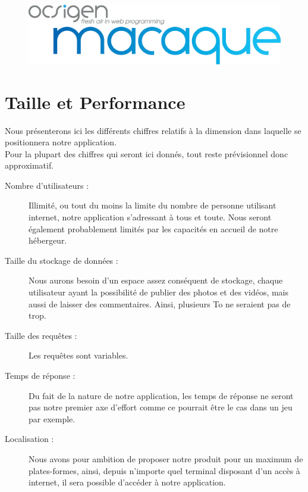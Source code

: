 \documentclass{life-fr}
\begin{document}
\begin{figure}[H]
  \begin{center}
    \includegraphics[width=13cm]{img/macaque.png}
  \end{center}
\end{figure}


\chapter{Taille et Performance}

Nous présenterons ici les différents chiffres relatifs à la dimension dans laquelle se positionnera notre application.\\
Pour la plupart des chiffres qui seront ici donnés, tout reste prévisionnel donc approximatif.\\

\begin{description}
  \item[Nombre d’utilisateurs :]
    Illimité, ou tout du moins la limite du nombre de personne utilisant internet, notre application s’adressant à tous et toute. Nous seront également probablement limités par les capacités en accueil de notre hébergeur.
  \item[Taille du stockage de données :]
    Nous aurons besoin d’un espace assez conséquent de stockage, chaque utilisateur ayant la possibilité de publier des photos et des vidéos, mais aussi de laisser des commentaires. Ainsi, plusieurs To ne seraient pas de trop.
  \item[Taille des requêtes :]
    Les requêtes sont variables.
  \item[Temps de réponse :]
    Du fait de la nature de notre application, les temps de réponse ne seront pas notre premier axe d’effort comme ce pourrait être le cas dans un jeu par exemple.
  \item[Localisation :]
    Nous avons pour ambition de proposer notre produit pour un maximum de plates-formes, ainsi, depuis n’importe quel terminal disposant d’un accès à internet, il sera possible d’accéder à notre application.
\end{description}
\end{document}
